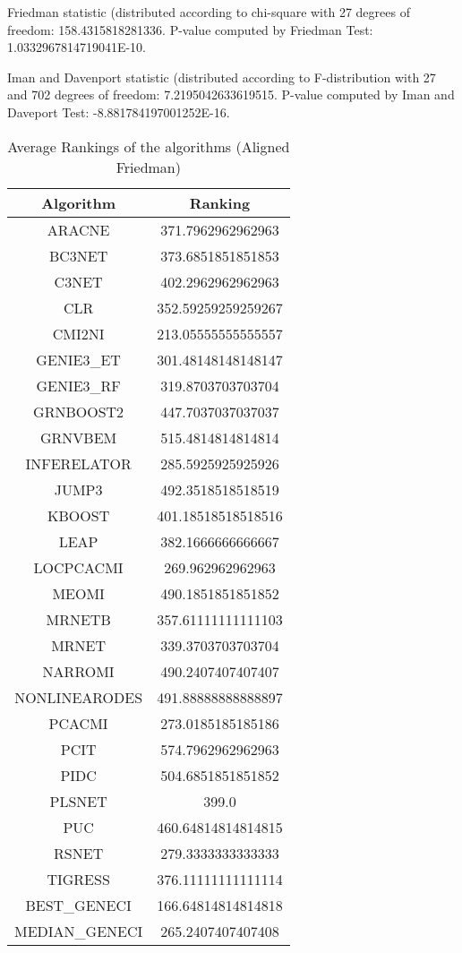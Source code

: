 \documentclass[a4paper,10pt]{article}
\begin{document}
\begin{landscape}
Friedman statistic (distributed according to chi-square with 27 degrees of freedom: 158.4315818281336. 
P-value computed by Friedman Test: 1.0332967814719041E-10.\newline

Iman and Davenport statistic (distributed according to F-distribution with 27 and 702 degrees of freedom: 7.2195042633619515. 
P-value computed by Iman and Daveport Test: -8.881784197001252E-16.\newline


\newpage

\begin{table}[!htp]
\centering
\caption{Average Rankings of the algorithms (Aligned Friedman)
}\begin{tabular}{c|c}
Algorithm&Ranking\\
\hline
ARACNE&371.7962962962963\\
BC3NET&373.6851851851853\\
C3NET&402.2962962962963\\
CLR&352.59259259259267\\
CMI2NI&213.05555555555557\\
GENIE3_ET&301.48148148148147\\
GENIE3_RF&319.8703703703704\\
GRNBOOST2&447.7037037037037\\
GRNVBEM&515.4814814814814\\
INFERELATOR&285.5925925925926\\
JUMP3&492.3518518518519\\
KBOOST&401.18518518518516\\
LEAP&382.1666666666667\\
LOCPCACMI&269.962962962963\\
MEOMI&490.1851851851852\\
MRNETB&357.61111111111103\\
MRNET&339.3703703703704\\
NARROMI&490.2407407407407\\
NONLINEARODES&491.88888888888897\\
PCACMI&273.0185185185186\\
PCIT&574.7962962962963\\
PIDC&504.6851851851852\\
PLSNET&399.0\\
PUC&460.64814814814815\\
RSNET&279.3333333333333\\
TIGRESS&376.11111111111114\\
BEST_GENECI&166.64814814814818\\
MEDIAN_GENECI&265.2407407407408\\
\end{tabular}
\end{table}



\end{landscape}
\end{document}
